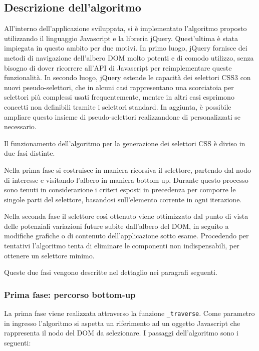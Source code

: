 \documentclass[12pt]{toptesi}
\begin{document}
\subsection {Descrizione dell'algoritmo}

All'interno dell'applicazione sviluppata, si è implementato l'algoritmo proposto utilizzando il linguaggio Javascript e la libreria jQuery. Quest'ultima è stata impiegata in questo ambito per due motivi. In primo luogo, jQuery fornisce dei metodi di navigazione dell'albero DOM molto potenti e di comodo utilizzo, senza bisogno di dover ricorrere all'API di Javascript per reimplementare queste funzionalità. In secondo luogo, jQuery estende le capacità dei selettori CSS3 con nuovi pseudo-selettori, che in alcuni casi rappresentano una scorciatoia per selettori più complessi usati frequentemente, mentre in altri casi esprimono concetti non definibili tramite i selettori standard. In aggiunta, è possibile ampliare questo insieme di pseudo-selettori realizzandone di personalizzati se necessario.

Il funzionamento dell'algoritmo per la generazione dei selettori CSS è diviso in due fasi distinte. 

Nella prima fase si costruisce in maniera ricorsiva il selettore, partendo dal nodo di interesse e visitando l'albero in maniera bottom-up. Durante questo processo sono tenuti in considerazione i criteri esposti in precedenza per comporre le singole parti del selettore, basandosi sull'elemento corrente in ogni iterazione.

Nella seconda fase il selettore così ottenuto viene ottimizzato dal punto di vista delle potenziali variazioni future subite dall'albero del DOM, in seguito a modifiche grafiche o di contenuto dell'applicazione sotto esame. Procedendo per tentativi l'algoritmo tenta di eliminare le componenti non indispensabili, per ottenere un selettore minimo.

Queste due fasi vengono descritte nel dettaglio nei paragrafi seguenti.

\subsubsection {Prima fase: percorso bottom-up}

La prima fase viene realizzata attraverso la funzione \verb|_traverse|. Come parametro in ingresso l'algoritmo si aspetta un riferimento ad un oggetto Javascript che rappresenta il nodo del DOM da selezionare. I passaggi dell'algoritmo sono i seguenti:
\end{document}
